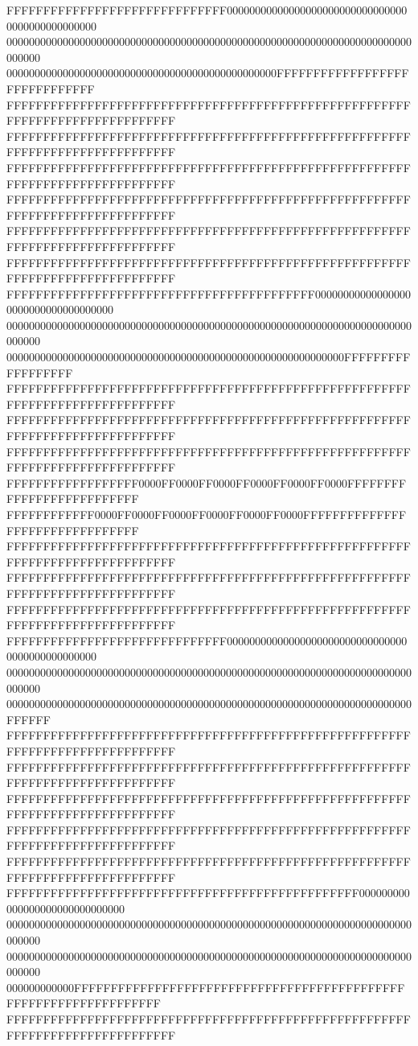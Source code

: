 FFFFFFFFFFFFFFFFFFFFFFFFFFFFFF000000000000000000000000000000000000000000000000
000000000000000000000000000000000000000000000000000000000000000000000000000000
000000000000000000000000000000000000000000000000FFFFFFFFFFFFFFFFFFFFFFFFFFFFFF
FFFFFFFFFFFFFFFFFFFFFFFFFFFFFFFFFFFFFFFFFFFFFFFFFFFFFFFFFFFFFFFFFFFFFFFFFFFFFF
FFFFFFFFFFFFFFFFFFFFFFFFFFFFFFFFFFFFFFFFFFFFFFFFFFFFFFFFFFFFFFFFFFFFFFFFFFFFFF
FFFFFFFFFFFFFFFFFFFFFFFFFFFFFFFFFFFFFFFFFFFFFFFFFFFFFFFFFFFFFFFFFFFFFFFFFFFFFF
FFFFFFFFFFFFFFFFFFFFFFFFFFFFFFFFFFFFFFFFFFFFFFFFFFFFFFFFFFFFFFFFFFFFFFFFFFFFFF
FFFFFFFFFFFFFFFFFFFFFFFFFFFFFFFFFFFFFFFFFFFFFFFFFFFFFFFFFFFFFFFFFFFFFFFFFFFFFF
FFFFFFFFFFFFFFFFFFFFFFFFFFFFFFFFFFFFFFFFFFFFFFFFFFFFFFFFFFFFFFFFFFFFFFFFFFFFFF
FFFFFFFFFFFFFFFFFFFFFFFFFFFFFFFFFFFFFFFFFF000000000000000000000000000000000000
000000000000000000000000000000000000000000000000000000000000000000000000000000
000000000000000000000000000000000000000000000000000000000000FFFFFFFFFFFFFFFFFF
FFFFFFFFFFFFFFFFFFFFFFFFFFFFFFFFFFFFFFFFFFFFFFFFFFFFFFFFFFFFFFFFFFFFFFFFFFFFFF
FFFFFFFFFFFFFFFFFFFFFFFFFFFFFFFFFFFFFFFFFFFFFFFFFFFFFFFFFFFFFFFFFFFFFFFFFFFFFF
FFFFFFFFFFFFFFFFFFFFFFFFFFFFFFFFFFFFFFFFFFFFFFFFFFFFFFFFFFFFFFFFFFFFFFFFFFFFFF
FFFFFFFFFFFFFFFFFF0000FF0000FF0000FF0000FF0000FF0000FFFFFFFFFFFFFFFFFFFFFFFFFF
FFFFFFFFFFFF0000FF0000FF0000FF0000FF0000FF0000FFFFFFFFFFFFFFFFFFFFFFFFFFFFFFFF
FFFFFFFFFFFFFFFFFFFFFFFFFFFFFFFFFFFFFFFFFFFFFFFFFFFFFFFFFFFFFFFFFFFFFFFFFFFFFF
FFFFFFFFFFFFFFFFFFFFFFFFFFFFFFFFFFFFFFFFFFFFFFFFFFFFFFFFFFFFFFFFFFFFFFFFFFFFFF
FFFFFFFFFFFFFFFFFFFFFFFFFFFFFFFFFFFFFFFFFFFFFFFFFFFFFFFFFFFFFFFFFFFFFFFFFFFFFF
FFFFFFFFFFFFFFFFFFFFFFFFFFFFFF000000000000000000000000000000000000000000000000
000000000000000000000000000000000000000000000000000000000000000000000000000000
000000000000000000000000000000000000000000000000000000000000000000000000FFFFFF
FFFFFFFFFFFFFFFFFFFFFFFFFFFFFFFFFFFFFFFFFFFFFFFFFFFFFFFFFFFFFFFFFFFFFFFFFFFFFF
FFFFFFFFFFFFFFFFFFFFFFFFFFFFFFFFFFFFFFFFFFFFFFFFFFFFFFFFFFFFFFFFFFFFFFFFFFFFFF
FFFFFFFFFFFFFFFFFFFFFFFFFFFFFFFFFFFFFFFFFFFFFFFFFFFFFFFFFFFFFFFFFFFFFFFFFFFFFF
FFFFFFFFFFFFFFFFFFFFFFFFFFFFFFFFFFFFFFFFFFFFFFFFFFFFFFFFFFFFFFFFFFFFFFFFFFFFFF
FFFFFFFFFFFFFFFFFFFFFFFFFFFFFFFFFFFFFFFFFFFFFFFFFFFFFFFFFFFFFFFFFFFFFFFFFFFFFF
FFFFFFFFFFFFFFFFFFFFFFFFFFFFFFFFFFFFFFFFFFFFFFFF000000000000000000000000000000
000000000000000000000000000000000000000000000000000000000000000000000000000000
000000000000000000000000000000000000000000000000000000000000000000000000000000
000000000000FFFFFFFFFFFFFFFFFFFFFFFFFFFFFFFFFFFFFFFFFFFFFFFFFFFFFFFFFFFFFFFFFF
FFFFFFFFFFFFFFFFFFFFFFFFFFFFFFFFFFFFFFFFFFFFFFFFFFFFFFFFFFFFFFFFFFFFFFFFFFFFFF
